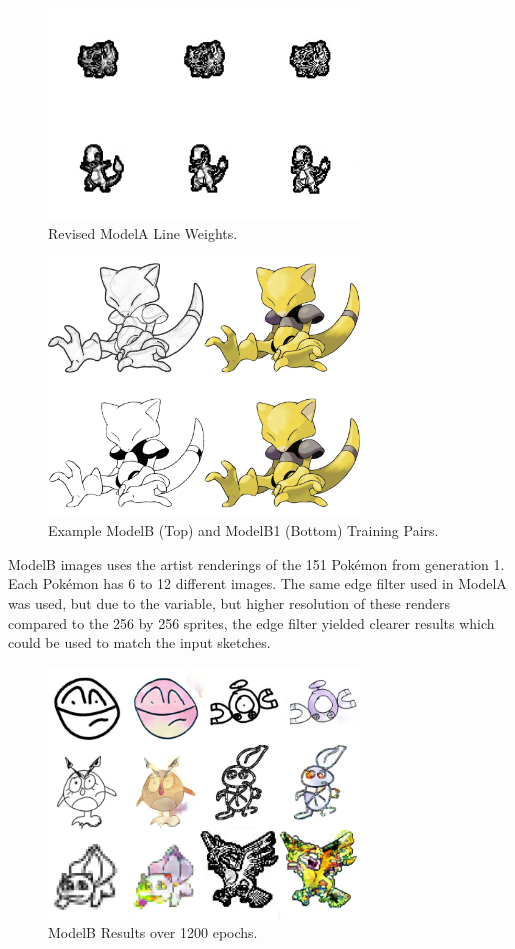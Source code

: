 \documentclass[sigchi]{acmart}
\begin{document}
\begin{figure}[h]
\includegraphics[width=3.25in]{figures/ModelA-LineWeights.jpg}
\caption{Revised ModelA Line Weights.}
\end{figure}


\begin{figure}[h]
\includegraphics[width=3.25in]{figures/Abra2-Edges.jpg}
\caption{Example ModelB (Top) and ModelB1 (Bottom) Training Pairs.}
\end{figure}


ModelB images uses the artist renderings of the 151 Pokémon from generation 1. Each Pokémon has 6 to 12 different images. The same edge filter used in ModelA was used, but due to the variable, but higher resolution of these renders compared to the 256 by 256 sprites, the edge filter yielded clearer results which could be used to match the input sketches.

\begin{figure}[h]
\includegraphics[width=3.25in]{figures/ModelB-Valid-1200render-70epoch.jpg}
\caption{ModelB Results over 1200 epochs.}
\end{figure}
\end{document}

